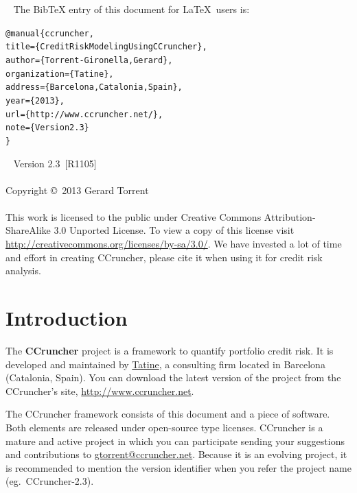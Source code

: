 \documentclass[11pt,fleqn]{book} %
\def\numversion{2.3}
\def\svnversion{R1105}
\begin{document}
~\vfill
The BibTeX entry of this document for \LaTeX\ users is:
\begin{alltt}
@manual\{ccruncher,
    title = \{Credit Risk Modeling Using CCruncher\},
    author = \{Torrent-Gironella, Gerard\},
    organization = \{Tatine\},
    address = \{Barcelona, Catalonia, Spain\},
    year = \{2013\},
    url = \{http://www.ccruncher.net/\},
    note = \{Version \numversion\}
\}
\end{alltt}

~\vfill
\thispagestyle{empty}
\noindent Version \numversion\ [\svnversion]\\ 
\\
\noindent Copyright \copyright\ 2013 Gerard Torrent\\
\\
\noindent 
This work is licensed to the public under Creative Commons 
Attribution-ShareAlike 3.0 Unported License. To view a copy 
of this license visit 
\url{http://creativecommons.org/licenses/by-sa/3.0/}.
We have invested a lot of time and effort in creating CCruncher, 
please cite it when using it for credit risk analysis.


\pagestyle{empty}
\setcounter{tocdepth}{1}
\tableofcontents
\cleardoublepage
\pagestyle{fancy}


\chapter{Introduction}

The \textbf{CCruncher} project is a framework to quantify portfolio credit 
risk. It is developed and maintained by \href{http://www.tatine.es}{Tatine}, 
a consulting firm located in Barcelona (Catalonia, Spain). You can download 
the latest version of the project from the CCruncher's site, 
\url{http://www.ccruncher.net}.

The CCruncher framework consists of this document and a piece of software. 
Both elements are released under open-source type licenses. CCruncher is a 
mature and active project in which you can participate sending your 
suggestions and contributions to \href{mailto:gtorrent@ccruncher.net}
{gtorrent@ccruncher.net}. Because it is an evolving project, it is recommended 
to mention the version identifier when you refer the project name 
(eg.\ CCruncher-\numversion).
\end{document}

